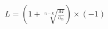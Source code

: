 \documentclass[12pt]{article}
\begin{document}
$ \begin{equation*}L=(1+\sqrt[n-k]{\frac{M}{a_n}}) \times (-1)\end{equation*} $
\end{document}
